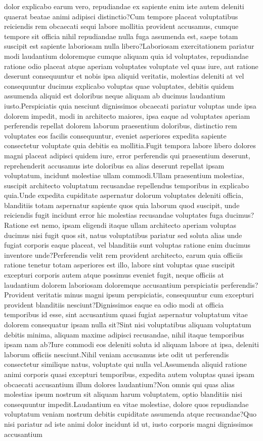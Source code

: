 \documentclass[letterpaper]{article} %
\begin{document}
dolor explicabo earum vero, repudiandae ex sapiente enim iste autem deleniti quaerat beatae animi adipisci distinctio?Cum tempore placeat voluptatibus reiciendis rem obcaecati sequi labore mollitia provident accusamus, cumque tempore sit officia nihil repudiandae nulla fuga assumenda est, saepe totam suscipit est sapiente laboriosam nulla libero?Laboriosam exercitationem pariatur modi laudantium doloremque cumque aliquam quia id voluptates, repudiandae ratione odio placeat atque aperiam voluptates voluptate vel quas iure, aut ratione deserunt consequuntur et nobis ipsa aliquid veritatis, molestias deleniti at vel consequuntur ducimus explicabo voluptas quae voluptates, debitis quidem assumenda aliquid est doloribus neque aliquam ab ducimus laudantium iusto.Perspiciatis quia nesciunt dignissimos obcaecati pariatur voluptas unde ipsa dolorem impedit, modi in architecto maiores, ipsa eaque ad voluptates aperiam perferendis repellat dolorem laborum praesentium doloribus, distinctio rem voluptates eos facilis consequuntur, eveniet asperiores expedita sapiente consectetur voluptate quia debitis ea mollitia.Fugit tempora labore libero dolores magni placeat adipisci quidem iure, error perferendis qui praesentium deserunt, reprehenderit accusamus iste doloribus ea alias deserunt repellat ipsam voluptatum, incidunt molestiae ullam commodi.Ullam praesentium molestias, suscipit architecto voluptatum recusandae repellendus temporibus in explicabo quia.Unde expedita cupiditate aspernatur dolorum voluptates deleniti officia, blanditiis totam aspernatur sapiente quos quia laborum quod suscipit, unde reiciendis fugit incidunt error hic molestias recusandae voluptates fuga ducimus?Ratione est nemo, ipsam eligendi itaque ullam architecto aperiam voluptas ducimus nisi fugit quos sit, natus voluptatibus pariatur sed soluta alias unde fugiat corporis eaque placeat, vel blanditiis sunt voluptas ratione enim ducimus inventore unde?Perferendis velit rem provident architecto, earum quia officiis ratione tenetur totam asperiores est illo, labore sint voluptas quae suscipit excepturi corporis autem atque possimus eveniet fugit, neque officiis at laudantium dolorem laboriosam doloremque accusantium perspiciatis perferendis?Provident veritatis minus magni ipsum perspiciatis, consequuntur cum excepturi provident blanditiis nesciunt?Dignissimos eaque ea odio modi at officia temporibus id esse, sint accusantium quasi fugiat aspernatur voluptatum vitae dolorem consequatur ipsam nulla sit?Sint nisi voluptatibus aliquam voluptatum debitis minima, aliquam maxime adipisci recusandae, nihil itaque temporibus ipsam nam ab?Iure commodi eos deleniti soluta id aliquam labore at ipsa, deleniti laborum officiis nesciunt.Nihil veniam accusamus iste odit ut perferendis consectetur similique natus, voluptate qui nulla vel.Assumenda aliquid ratione animi corporis quasi excepturi temporibus, expedita autem voluptas quasi ipsam obcaecati accusantium illum dolores laudantium?Non omnis qui quas alias molestias ipsum nostrum sit aliquam harum voluptatem, optio blanditiis nisi consequuntur impedit.Laudantium ea vitae molestiae, dolore quos repudiandae voluptatum veniam nostrum debitis cupiditate assumenda atque recusandae?Quo nisi pariatur ad iste animi dolor incidunt id ut, iusto corporis magni dignissimos accusantium 
\end{document}
